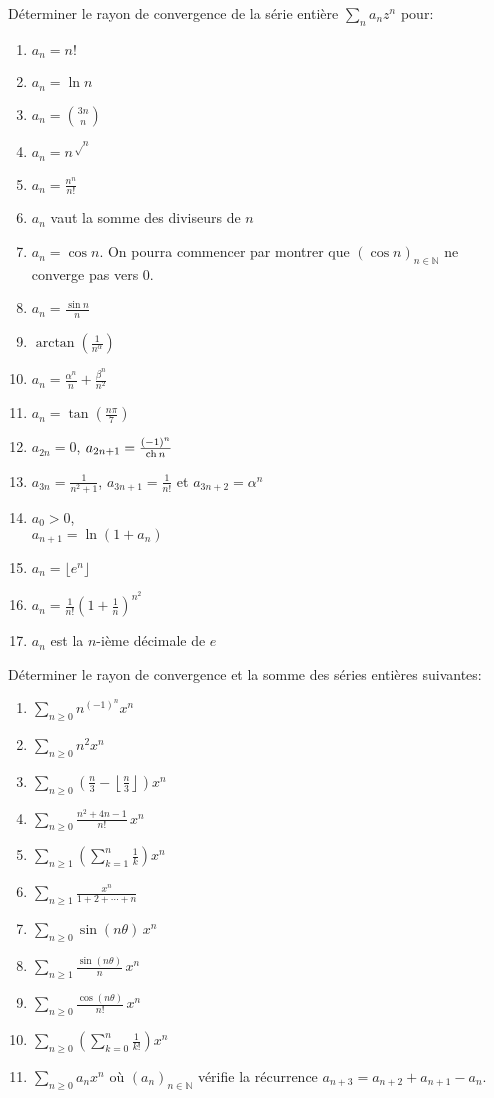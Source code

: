 \documentclass{yann}
\newcommand{\me}{e} %
\begin{document}
Déterminer le rayon de convergence de la série entière $∑_n a_n z^n$ pour:
\begin{multicols}{2}
  \begin{enumerate}
  \item
$a_n = n!$
  \item
$a_n = \ln n$
  \item
$a_n = \binom{3n}{n}$
  \item
$a_n = n^{√n}$
  \item
$a_n = \frac{n^n}{n!}$
  \item
$a_n$ vaut la somme des diviseurs de $n$
  \item
$a_n = \cos n$.
    On pourra commencer par montrer que $(\cos n)_{n∈ℕ}$ ne converge pas vers $0$.
  \item
$a_n = \frac{\sin n}{n}$
  \item
$\arctan\left(\frac1{n^α}\right)$
  \item
$a_n = \frac{α^n}{n} + \frac{β^n}{n^2}$
  \item
$a_n = \tan\left(\frac{nπ}{7}\right)$
  \item
$a_{2n} = 0$,  $a_{2n+1} = \frac{(-1)^n}{\operatorname{ch} n}$
  \item
$a_{3n} = \frac{1}{n^2+1}$, $a_{3n+1}=\frac{1}{n!}$ et $a_{3n+2} = α^n$
  \item
$a_0 > 0$, \\ $a_{n+1} = \ln(1+a_n)$
  \item
$a_n = \lfloor \me^n \rfloor$
  \item
$a_n = \frac{1}{n!} \left( 1+\frac1n \right)^{n^2}$
  \item
$a_n$ est la $n$-ième décimale de $e$
  \end{enumerate}
\end{multicols}

\Exercice

Déterminer le rayon de convergence et la somme des séries entières suivantes:
\begin{multicols}{2}
  \begin{enumerate}
  \item
$∑_{n≥0} n^{(-1)^n} x^n$
  \item
$∑_{n≥0} n^2 x^n$
  \item
$∑_{n≥0} \left( \frac n3 - \left\lfloor \frac n3 \right\rfloor \right) x^n$
  \item
$∑_{n≥0} \frac{n^2+4n-1}{n!} \, x^n$
  \item
$∑_{n≥1} \left( ∑_{k=1}^n \frac1k \right) x^n$
  \item
$∑_{n≥1} \frac{x^n}{1+2+\cdots+n}$
  \item
$∑_{n≥0} \sin(nθ) \, x^n$
  \item
$∑_{n≥1} \frac{\sin(nθ)}{n} \, x^n$
  \item
$∑_{n≥0} \frac{\cos(nθ)}{n!} \, x^n$
  \item
$∑_{n≥0} \left( ∑_{k=0}^n \frac{1}{k!} \right) x^n$
  \item
$∑_{n≥0} a_n x^n$ où $(a_n)_{n∈ℕ}$ vérifie la récurrence $a_{n+3}=a_{n+2}+a_{n+1}-a_n$.
  \end{enumerate}
\end{multicols}
\end{document}
